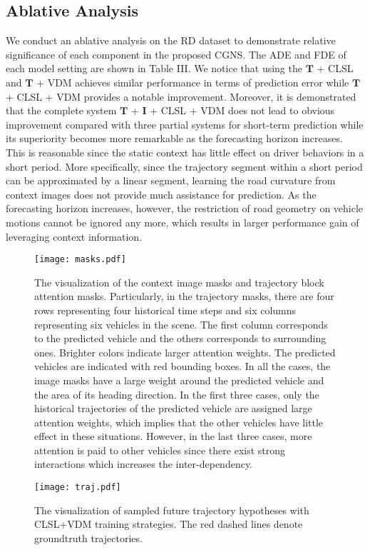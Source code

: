 \documentclass[letterpaper, 10 pt, conference]{ieeeconf}
\begin{document}
\subsection{Ablative Analysis}
We conduct an ablative analysis on the RD dataset to demonstrate relative significance of each component in the proposed CGNS. The ADE and FDE of each model setting are shown in Table III.
We notice that using the $\mathbf{T}$ + CLSL and $\mathbf{T}$ + VDM achieves similar performance in terms of prediction error while $\mathbf{T}$ + CLSL + VDM provides a notable improvement. 
Moreover, it is demonstrated that the complete system $\mathbf{T}$ + $\mathbf{I}$ + CLSL + VDM does not lead to obvious improvement compared with three partial systems for short-term prediction while its superiority becomes more remarkable as the forecasting horizon increases. This is reasonable since the static context has little effect on driver behaviors in a short period.
More specifically, since the trajectory segment within a short period can be approximated by a linear segment, learning the road curvature from context images does not provide much assistance for prediction. As the forecasting horizon increases, however, the restriction of road geometry on vehicle motions cannot be ignored any more, which results in larger performance gain of leveraging context information.
\begin{figure*}[!tbp]
	\centering
	\texttt{[image: masks.pdf]}
	\caption{The visualization of the context image masks and trajectory block attention masks. Particularly, in the trajectory masks, there are four rows representing four historical time steps and six columns representing six vehicles in the scene. The first column corresponds to the predicted vehicle and the others corresponds to surrounding ones. Brighter colors indicate larger attention weights. The predicted vehicles are indicated with red bounding boxes. In all the cases, the image masks have a large weight around the predicted vehicle and the area of its heading direction. In the first three cases, only the historical trajectories of the predicted vehicle are assigned large attention weights, which implies that the other vehicles have little effect in these situations. However, in the last three cases, more attention is paid to other vehicles since there exist strong interactions which increases the inter-dependency.}
\end{figure*}
\begin{figure}[!tbp]
	\centering
	\texttt{[image: traj.pdf]}
	\caption{The visualization of sampled future trajectory hypotheses with CLSL+VDM training strategies. The red dashed lines denote groundtruth trajectories.}
\end{figure}
\end{document}

